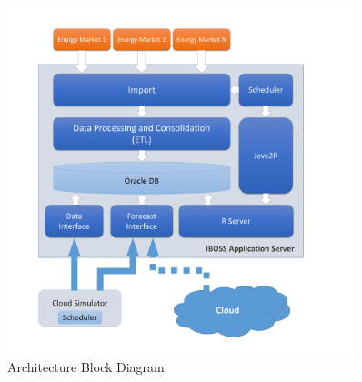 \documentclass[paper=a4, fontsize=11pt]{scrartcl} %
\numberwithin{equation}{section} %
\numberwithin{figure}{section} %
\numberwithin{table}{section} %
\begin{document}
\begin{figure}[htbp]
	\centering
		\includegraphics[width=0.9\textwidth]{figures/Block_Diagram_Architecture.pdf}
	\caption{Architecture Block Diagram}
	\label{fig:Block_Diagram_Architecture}
\end{figure}
\end{document}
